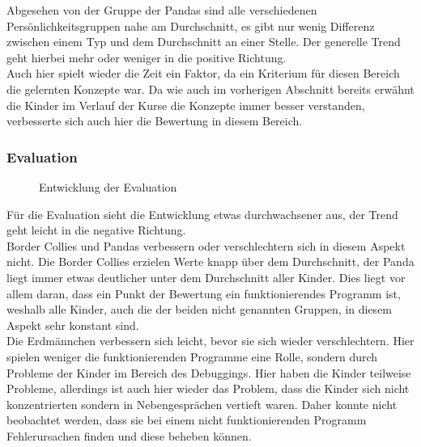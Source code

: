 Abgesehen von der Gruppe der Pandas sind alle verschiedenen Persönlichkeitsgruppen nahe am Durchschnitt, es gibt nur wenig Differenz zwischen einem Typ und dem Durchschnitt an einer Stelle. Der generelle Trend geht hierbei mehr oder weniger in die positive Richtung.\\
Auch hier spielt wieder die Zeit ein Faktor, da ein Kriterium für diesen Bereich die gelernten Konzepte war. Da wie auch im vorherigen Abschnitt bereits erwähnt die Kinder im Verlauf der Kurse die Konzepte immer besser verstanden, verbesserte sich auch hier die Bewertung in diesem Bereich. 
\subsubsection{Evaluation}
\begin{figure}[H]
	\centering
	\caption{Entwicklung der Evaluation}
\end{figure}

Für die Evaluation sieht die Entwicklung etwas durchwachsener aus, der Trend geht leicht in die negative Richtung.\\
Border Collies und Pandas verbessern oder verschlechtern sich in diesem Aspekt nicht. Die Border Collies erzielen Werte knapp über dem Durchschnitt, der Panda liegt immer etwas deutlicher unter dem Durchschnitt aller Kinder. Dies liegt vor allem daran, dass ein Punkt der Bewertung ein funktionierendes Programm ist, weshalb alle Kinder, auch die der beiden nicht genannten Gruppen, in diesem Aspekt sehr konstant sind.\\
Die Erdmännchen verbessern sich leicht, bevor sie sich wieder verschlechtern. Hier spielen weniger die funktionierenden Programme eine Rolle, sondern durch Probleme der Kinder im Bereich des Debuggings. Hier haben die Kinder teilweise Probleme, allerdings ist auch hier wieder das Problem, dass die Kinder sich nicht konzentrierten sondern in Nebengesprächen vertieft waren. Daher konnte nicht beobachtet werden, dass sie bei einem nicht funktionierenden Programm Fehlerursachen finden und diese beheben können.


